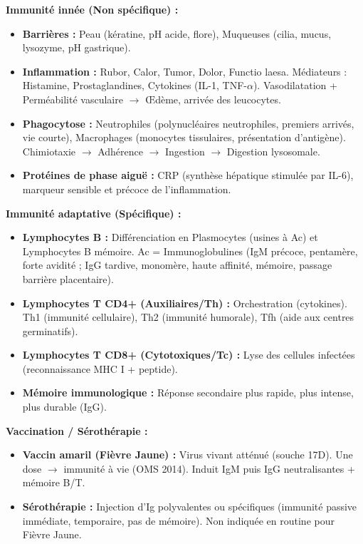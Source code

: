 \documentclass[11pt]{article}
\newcounter{popsec}
\newcounter{popsub}
\newcommand{\courssub}[1]{%
  \stepcounter{popsub}%
  \par\vspace{9pt}\noindent{\popxbold\fontsize{11.5}{13}\selectfont\color{popink}{\color{poporange}\thepopsec.\thepopsub}\hspace{6pt}#1}\par\nopagebreak\vspace{4pt}
}
\begin{document}
\courssub{Ressources à mobiliser}
\begin{aretenir}
\textbf{Immunité innée (Non spécifique) :}
\begin{itemize}
    \item \textbf{Barrières :} Peau (kératine, pH acide, flore), Muqueuses (cilia, mucus, lysozyme, pH gastrique).
    \item \textbf{Inflammation :} Rubor, Calor, Tumor, Dolor, Functio laesa. Médiateurs : Histamine, Prostaglandines, Cytokines (IL-1, TNF-$\alpha$). Vasodilatation + Perméabilité vasculaire $\rightarrow$ Œdème, arrivée des leucocytes.
    \item \textbf{Phagocytose :} Neutrophiles (polynucléaires neutrophiles, premiers arrivés, vie courte), Macrophages (monocytes tissulaires, présentation d'antigène). Chimiotaxie $\rightarrow$ Adhérence $\rightarrow$ Ingestion $\rightarrow$ Digestion lysosomale.
    \item \textbf{Protéines de phase aiguë :} CRP (synthèse hépatique stimulée par IL-6), marqueur sensible et précoce de l'inflammation.
\end{itemize}
\textbf{Immunité adaptative (Spécifique) :}
\begin{itemize}
    \item \textbf{Lymphocytes B :} Différenciation en Plasmocytes (usines à Ac) et Lymphocytes B mémoire. Ac = Immunoglobulines (IgM précoce, pentamère, forte avidité ; IgG tardive, monomère, haute affinité, mémoire, passage barrière placentaire).
    \item \textbf{Lymphocytes T CD4+ (Auxiliaires/Th) :} Orchestration (cytokines). Th1 (immunité cellulaire), Th2 (immunité humorale), Tfh (aide aux centres germinatifs).
    \item \textbf{Lymphocytes T CD8+ (Cytotoxiques/Tc) :} Lyse des cellules infectées (reconnaissance MHC I + peptide).
    \item \textbf{Mémoire immunologique :} Réponse secondaire plus rapide, plus intense, plus durable (IgG).
\end{itemize}
\textbf{Vaccination / Sérothérapie :}
\begin{itemize}
    \item \textbf{Vaccin amaril (Fièvre Jaune) :} Virus vivant atténué (souche 17D). Une dose $\rightarrow$ immunité à vie (OMS 2014). Induit IgM puis IgG neutralisantes + mémoire B/T.
    \item \textbf{Sérothérapie :} Injection d'Ig polyvalentes ou spécifiques (immunité passive immédiate, temporaire, pas de mémoire). Non indiquée en routine pour Fièvre Jaune.

\end{itemize}
\end{aretenir}
\end{document}
